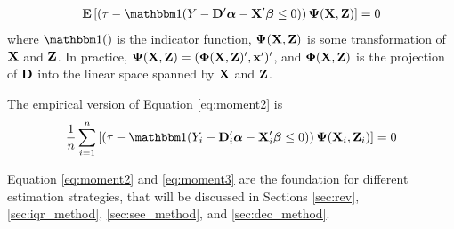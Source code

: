 \begin{align}
\E \left[ \left( \tau - \I (Y  - \Db'\alphab - \Xb'\betab \leq 0)
	\right) \Psib(\Xb, \Zb) \right]= 0 \label{eq:moment2}
\end{align}
where $\I()$ is the indicator function, $\boldsymbol{\Psi}(\mathbf{X}, \mathbf{Z})$ is some transformation
of $\mathbf{X}$ and $\mathbf{Z}$. In practice, $\boldsymbol{\Psi}(\mathbf{X}, \mathbf{Z}) = (\boldsymbol{\Phi}(\mathbf{X}, \mathbf{Z})',
  \mathbf{x}')'$, and $\boldsymbol{\Phi}(\mathbf{X}, \mathbf{Z})$ is the projection of
$\mathbf{D}$ into the linear space spanned by $\mathbf{X}$ and $\mathbf{Z}$.

The empirical version of Equation \ref{eq:moment2} is
\begin{align}
\frac{1}{n} \sum_{i=1}^n \left[ 
	\left( 
	\tau - \I (Y_i  - \Db_i'\alphab - \Xb_i'\betab \leq 0) 
	\right) 
	\Psib(\Xb_i, \Zb_i) 
	\right]= 0 
\label{eq:moment3}
\end{align}

Equation \ref{eq:moment2} and \ref{eq:moment3} are the foundation for different
estimation strategies, that will be discussed in Sections \ref{sec:rev},
\ref{sec:iqr_method}, \ref{sec:see_method}, and \ref{sec:dec_method}.
